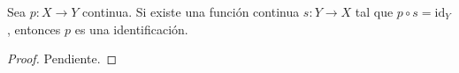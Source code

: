 

\begin{theorem}
Sea $p : X \longrightarrow Y$ continua. Si existe una función continua $s : Y \longrightarrow X$ tal que $p \circ s = \text{id}_Y$, entonces $p$ es una identificación.
\end{theorem}

\begin{proof}
Pendiente.
\end{proof}
